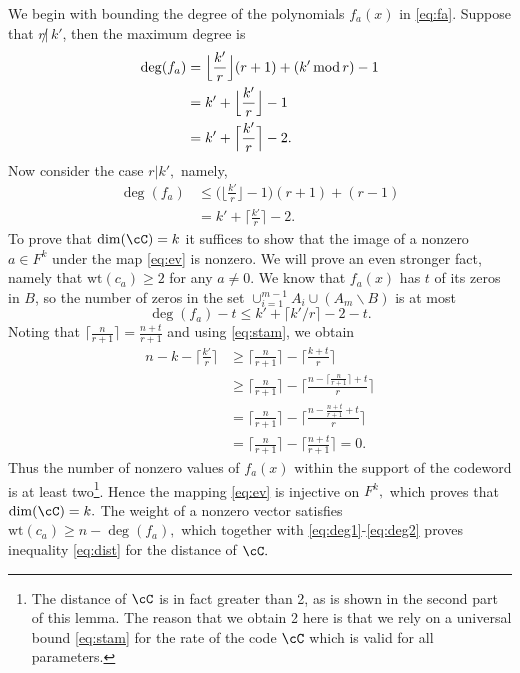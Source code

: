\documentclass{IEEEtran}
\newcommand{\Mod}[1]{\,\textup{mod}\,#1}
\begin{document}
\begin{IEEEproof}
We begin with bounding the degree of the polynomials $f_a(x)$ in \eqref{eq:fa}.
Suppose that $ r\!\!\not|\,k' $, then the maximum degree is
  \begin{align}
  \deg(f_a)&= \Big\lfloor \frac{k'}{r}\Big\rfloor (r+1) + (k' \Mod r) -1\nonumber\\
  & = k' + \Big\lfloor \frac{k'}{r}\Big\rfloor -1 \\
&= k' + \Big\lceil \frac{k'}{r}\Big\rceil -2. \label{eq:deg1}
  \end{align}
Now consider the case $r|k',$ namely,
  \begin{align}
  \deg(f_a)&\le \Big(\Big\lfloor \frac{k'}{r}\Big\rfloor -1 \Big)(r+1) + (r-1) \nonumber
\\&= k' + \Big\lceil \frac{k'}{r}\Big\rceil -2.\label{eq:deg2}
  \end{align}
To prove that $\dim(\cC)=k$ it suffices to show that the image of a nonzero $a\in F^k$ under the map \eqref{eq:ev} is nonzero.
We will prove an even stronger fact, namely that $\text{wt}(c_a)\ge 2$ for any $a\ne 0.$  We know that $f_a(x)$ has $t$ of its zeros in $B$, so the number of zeros in the 
set $\cup_{i=1}^{m-1} A_i\cup(A_m\backslash B)$ is at most 
  $$\deg(f_a)-t\leq k'+\lceil k'/r\rceil -2-t.$$
Noting that $\lceil\frac n{r+1}\rceil=\frac{n+t}{r+1}$ and using \eqref{eq:stam}, we obtain
   \begin{align*}
n-k-\Big\lceil \frac{k'}{r}\Big\rceil&\geq \Big\lceil \frac{n}{r+1} \Big\rceil-\Big\lceil \frac{k+t}{r}\Big\rceil \\
&\geq \Big\lceil \frac{n}{r+1} \Big\rceil-\Big\lceil \frac{n-\lceil \frac{n}{r+1} \rceil+t}{r}\Big\rceil\\
&= \Big\lceil \frac{n}{r+1} \Big\rceil-\Big\lceil \frac{n- \frac{n+t}{r+1}+t}{r}\Big\rceil\nonumber\\
&= \Big\lceil \frac{n}{r+1} \Big\rceil-\Big\lceil \frac{n+t}{r+1}\Big\rceil=0.
  \end{align*}
  Thus the number of nonzero values of $f_a(x)$ within the support of the codeword is at least two\footnote{The distance of $\cC$ is in fact greater than 2, as is shown in the second part of this lemma. The reason that we obtain 2 here is that we rely on a universal
  bound \eqref{eq:stam} for the rate of the code $\cC$ which is valid for all parameters.}.
Hence the mapping \eqref{eq:ev} is injective on $F^k,$ which proves that $\dim(\cC)=k.$
The weight of a nonzero vector satisfies $\text{wt}(c_a)\ge n-\deg(f_a),$ which together with \eqref{eq:deg1}-\eqref{eq:deg2}
 proves inequality \eqref{eq:dist} for the distance of $\cC.$
\end{IEEEproof}
\end{document}
